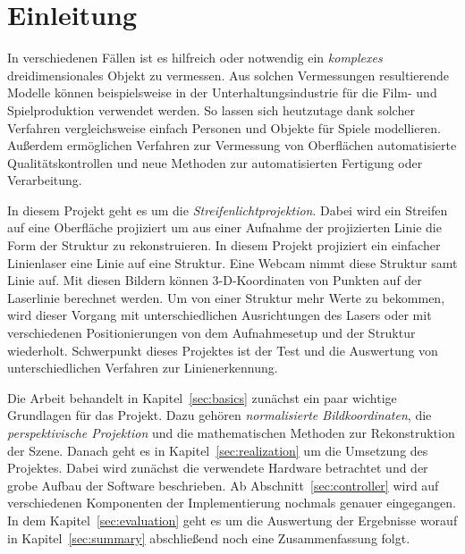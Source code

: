\documentclass[ngerman,a4paper,parskip=half]{scrartcl}
\begin{document}


\tableofcontents
\newpage


\section{Einleitung}
\label{sec:introduction}

In verschiedenen Fällen ist es hilfreich oder notwendig ein \emph{komplexes} dreidimensionales Objekt zu vermessen. Aus solchen Vermessungen resultierende Modelle können beispielsweise in der Unterhaltungsindustrie für die Film- und Spielproduktion verwendet werden. So lassen sich heutzutage dank solcher Verfahren vergleichsweise einfach Personen und Objekte für Spiele modellieren. Außerdem ermöglichen Verfahren zur Vermessung von Oberflächen automatisierte Qualitätskontrollen und neue Methoden zur automatisierten Fertigung oder Verarbeitung.

In diesem Projekt geht es um die \emph{Streifenlichtprojektion}. Dabei wird ein Streifen auf eine Oberfläche projiziert um aus einer Aufnahme der projizierten Linie die Form der Struktur zu rekonstruieren. In diesem Projekt projiziert ein einfacher Linienlaser eine Linie auf eine Struktur. Eine Webcam nimmt diese Struktur samt Linie auf. Mit diesen Bildern können 3-D-Koordinaten von Punkten auf der Laserlinie berechnet werden. Um von einer Struktur mehr Werte zu bekommen, wird dieser Vorgang mit unterschiedlichen Ausrichtungen des Lasers oder mit verschiedenen Positionierungen von dem Aufnahmesetup und der Struktur wiederholt. Schwerpunkt dieses Projektes ist der Test und die Auswertung von unterschiedlichen Verfahren zur Linienerkennung.

Die Arbeit behandelt in Kapitel~\ref{sec:basics} zunächst ein paar wichtige Grundlagen für das Projekt. Dazu gehören \emph{normalisierte Bildkoordinaten}, die \emph{perspektivische Projektion} und die mathematischen Methoden zur Rekonstruktion der Szene. Danach geht es in Kapitel~\ref{sec:realization} um die Umsetzung des Projektes. Dabei wird zunächst die verwendete Hardware betrachtet und der grobe Aufbau der Software beschrieben. Ab Abschnitt~\ref{sec:controller} wird auf verschiedenen Komponenten der Implementierung nochmals genauer eingegangen. In dem Kapitel~\ref{sec:evaluation} geht es um die Auswertung der Ergebnisse worauf in Kapitel~\ref{sec:summary} abschließend noch eine Zusammenfassung folgt.
\end{document}
